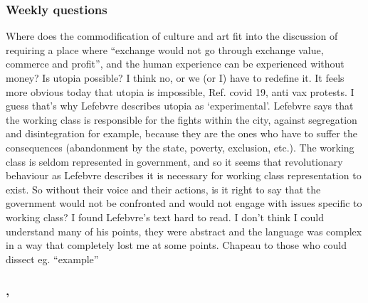 \documentclass{article}
\begin{document}
\subsubsection{Weekly questions}

\begin{outline}
	\1 Where does the commodification of culture and art fit into the discussion of requiring a place where ``exchange would not go through exchange value, commerce and profit'', and the human experience can be experienced without money?
	\1 Is utopia possible? I think no, or we (or I) have to redefine it. It feels more obvious today that utopia is impossible, Ref. covid 19, anti vax protests. I guess that's why Lefebvre describes utopia as `experimental'. 
	\1 Lefebvre says that the working class is responsible for the fights within the city, against segregation and disintegration for example, because they are the ones who have to suffer the consequences (abandonment by the state, poverty, exclusion, etc.). The working class is seldom represented in government, and so it seems that revolutionary behaviour as Lefebvre describes it is necessary for working class representation to exist. So without their voice and their actions, is it right to say that the government would not be confronted and would not engage with issues specific to working class?
	\1 I found Lefebvre's text hard to read. I don't think I could understand many of his points, they were abstract and the language was complex in a way that completely lost me at some points. Chapeau to those who could dissect eg. ``example''
\end{outline}




\begin{outline}
	\1
\end{outline}

\subsubsection{, \textit{}}
\fi
\end{document}
